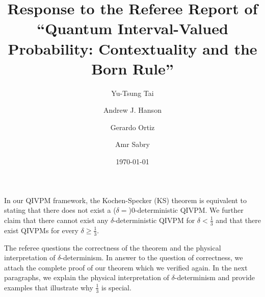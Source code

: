 \documentclass[english,reprint, aps, prl,superscriptaddress, showpacs,
showkeys, longbibliography, amsmath, amssymb, floatfix]{revtex4-1}
\theoremstyle{plain}
\theoremstyle{definition}
\begin{document}
\title{Response to the Referee Report of ``Quantum Interval-Valued Probability:
Contextuality and the Born Rule''}

\author{Yu-Tsung Tai}



\author{Andrew J. Hanson}


\author{Gerardo Ortiz}


\author{Amr Sabry}


\date{\today}

\maketitle

In our QIVPM framework, the Kochen-Specker (KS) theorem is equivalent
to stating that there does not exist a ($\delta=$)$0$-deterministic
QIVPM. We further claim that there cannot exist any $\delta$-deterministic
QIVPM for $\delta<\frac{1}{3}$ and that there exist QIVPMs for every
$\delta\ge\frac{1}{3}$.

The referee questions the correctness of the theorem and the physical
interpretation of $\delta$-determinism. In answer to the question
of correctness, we attach the complete proof of our theorem which
we verified again. In the next paragraphs, we explain the physical
interpretation of $\delta$-determinism and provide examples that
illustrate why $\frac{1}{3}$ is special.
\end{document}
